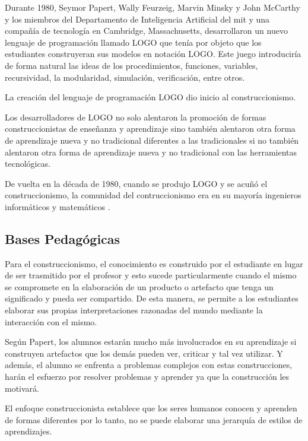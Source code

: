 Durante 1980, Seymor Papert, Wally Feurzeig, Marvin Minsky y John McCarthy y los
miembros del Departamento de Inteligencia Artificial del \Gls{mit} y una
compañía de tecnología en Cambridge, Massachusetts, desarrollaron un nuevo
lenguaje de programación llamado LOGO que tenía por objeto que los estudiantes
construyeran sus modelos en notación LOGO\@. Este juego introduciría de forma
natural las ideas de los procedimientos, funciones, variables, recursividad, la
modularidad, simulación, verificación, entre otros.

La creación del lenguaje de programación LOGO dio inicio al construccionismo.

Los desarrolladores de LOGO no solo alentaron la promoción de formas
construccionistas de enseñanza y aprendizaje sino también alentaron otra forma
de aprendizaje nueva y no tradicional diferentes a las tradicionales si no
también alentaron otra forma de aprendizaje nueva y no tradicional con las
herramientas tecnológicas. 

De vuelta en la década de 1980, cuando se produjo LOGO y se acuñó el
construccionismo, la comunidad del contruccionismo era en su mayoría  ingenieros
informáticos y matemáticos \cite{historia:2014}.

\subsection{Bases Pedagógicas}

Para el construccionismo, el conocimiento es construido por el estudiante en
lugar de ser trasmitido por el profesor\cite{moses:2003} y esto sucede
particularmente cuando el mismo se compromete en la elaboración de un producto o
artefacto que tenga un significado y pueda ser compartido\cite{valdivia:sg}. De
esta manera, se permite a los estudiantes elaborar sus propias interpretaciones
razonadas del mundo mediante la interacción con el mismo.

Según Papert, los alumnos estarán mucho más involucrados en su aprendizaje si
construyen artefactos que los demás pueden ver, criticar y tal vez utilizar. Y
además, el alumno se enfrenta a problemas complejos con estas construcciones,
harán el esfuerzo por resolver problemas y aprender ya que la construcción les
motivará\cite{const:vs}.

El enfoque construccionista establece que los seres humanos conocen y aprenden
de formas diferentes por lo tanto, no se puede elaborar una jerarquía de estilos
de aprendizajes\cite{valdivia:sg}.

